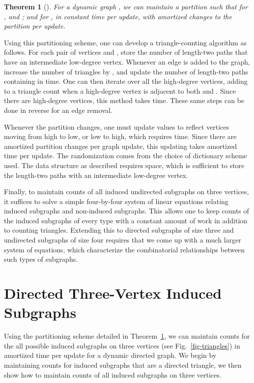 \documentclass[11pt]{article}
\newtheorem{theorem}{Theorem}[section]
\begin{document}
\begin{theorem}[\cite{es-hgadss-09}]
\label{thm-partition}
For a dynamic graph , we can maintain a partition  
such that for ,  and ;
and for ,  in constant time per
update, with amortized  changes to the partition per update.
\end{theorem}

Using this partitioning scheme, one can develop a triangle-counting 
algorithm as follows. For each pair of vertices  and , store 
the number of length-two paths  that have an intermediate 
low-degree vertex. Whenever an edge  is added to the graph, 
increase the number of triangles by , and update the number of
length-two paths containing  in  time. One can
then iterate over all the high-degree vertices, adding to a 
triangle count when a 
high-degree vertex is adjacent to both  and . Since there are 
 high-degree vertices, this method takes  time. These same steps 
can be done in reverse for an edge removal.

Whenever the partition changes, one must update  values
to reflect vertices moving from high to low, or low to high, which 
requires  time. Since there are amortized  partition 
changes per graph update, this updating takes  amortized time 
per update. The randomization comes from the choice of dictionary 
scheme used. The data structure as described requires  space, 
which is sufficient to store the length-two paths with an intermediate 
low-degree vertex. 

Finally, to maintain counts of all induced undirected 
subgraphs on three vertices,
it suffices to solve a simple four-by-four 
system of linear equations relating induced
subgraphs and non-induced subgraphs. This allows one to keep counts 
of the induced subgraphs of every type with a constant amount of 
work in addition to counting triangles.
Extending this to directed subgraphs of size three and undirected
subgraphs of size four requires that we come up with a much larger
system of equations, which characterize the combinatorial
relationships between such types of subgraphs.

\section{Directed Three-Vertex Induced Subgraphs}

Using the partitioning scheme detailed in Theorem~\ref{thm-partition}, we
can maintain counts for the all possible induced subgraphs on three vertices (see 
Fig.~\ref{fig-triangles}) in  amortized time per update for a dynamic
directed graph. We begin by maintaining counts for induced subgraphs that are a
directed triangle, we then show how to maintain counts of all induced
subgraphs on three vertices.
\end{document}
